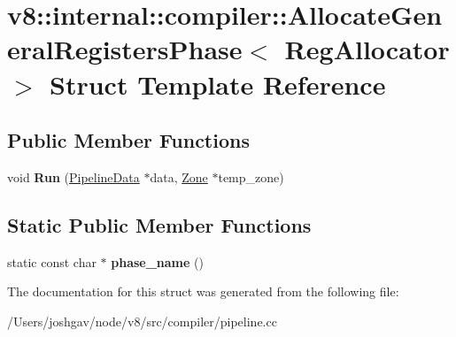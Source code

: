 \hypertarget{structv8_1_1internal_1_1compiler_1_1_allocate_general_registers_phase}{}\section{v8\+:\+:internal\+:\+:compiler\+:\+:Allocate\+General\+Registers\+Phase$<$ Reg\+Allocator $>$ Struct Template Reference}
\label{structv8_1_1internal_1_1compiler_1_1_allocate_general_registers_phase}
\subsection*{Public Member Functions}
\begin{DoxyCompactItemize}
\item 
void {\bfseries Run} (\hyperlink{classv8_1_1internal_1_1compiler_1_1_pipeline_data}{Pipeline\+Data} $\ast$data, \hyperlink{classv8_1_1internal_1_1_zone}{Zone} $\ast$temp\+\_\+zone)\hypertarget{structv8_1_1internal_1_1compiler_1_1_allocate_general_registers_phase_a55c00393389c82edb2c9a5bd71e19465}{}\label{structv8_1_1internal_1_1compiler_1_1_allocate_general_registers_phase_a55c00393389c82edb2c9a5bd71e19465}

\end{DoxyCompactItemize}
\subsection*{Static Public Member Functions}
\begin{DoxyCompactItemize}
\item 
static const char $\ast$ {\bfseries phase\+\_\+name} ()\hypertarget{structv8_1_1internal_1_1compiler_1_1_allocate_general_registers_phase_a1e84383afb21659a68d7ee495ff46edd}{}\label{structv8_1_1internal_1_1compiler_1_1_allocate_general_registers_phase_a1e84383afb21659a68d7ee495ff46edd}

\end{DoxyCompactItemize}


The documentation for this struct was generated from the following file\+:\begin{DoxyCompactItemize}
\item 
/\+Users/joshgav/node/v8/src/compiler/pipeline.\+cc\end{DoxyCompactItemize}
